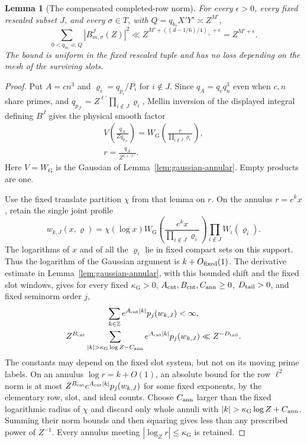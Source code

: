 \documentclass[11pt,a4paper]{article}
\numberwithin{equation}{section}
\numberwithin{figure}{section}
\newtheorem{lemma}[theorem]{Lemma}
\theoremstyle{definition}
\theoremstyle{remark}
\begin{document}
\begin{lemma}[The compensated completed-row norm]\label{lem:probe-row-norm}
For every $\epsilon>0$, every fixed rescaled subset $J$, and every
$\sigma\in T$, with $Q=q_{b_*}X'Y'\asymp Z^{M'}$,
\begin{equation}
 \sum_{0<q_m\ll Q}|B^J_{m,\sigma}(Z)|^2
       \ll Z^{M'+((d-1/6)/4)_++\epsilon}
       =Z^{M'+\epsilon}.
 \label{old-eq:5.4}
\end{equation}
The bound is uniform in the fixed rescaled tuple and has no
loss depending on the mesh of the surviving slots.
\end{lemma}

\begin{proof}
Put $A=cn^3$ and $\varrho_i=q_{p_i}/P_i$ for $i\notin J$.  Since
$q_A=q_cq_n^3$ even when $c,n$ share primes, and
$q_{p_{J^c}}=Z^{\ell'}\prod_{i\notin J}\varrho_i$, Mellin inversion
of the displayed integral defining $B^J$ gives the physical smooth factor
\[
 \begin{gathered}
 V\!\left(\frac{q_A}{Zq_{p_{J^c}}}\right)
 =W_{\mathrm G}\!\left(\frac{r}{\prod_{i\notin J}\varrho_i}\right),\\
 r=\frac{q_A}{Z^{1+\ell'}}.
 \end{gathered}
\]
Here $V=W_{\mathrm G}$ is the Gaussian of
Lemma~\ref{lem:gaussian-annular}.  Empty products are one.

Use the fixed translate partition $\chi$ from that lemma on $r$.
On the annulus $r=e^kx$, retain the single joint profile
\[
 w_{k,J}(x,\boldsymbol\varrho)
 =\chi(\log x)W_{\mathrm G}\!\left(
       \frac{e^kx}{\prod_{i\notin J}\varrho_i}\right)
       \prod_{i\notin J}W_i(\varrho_i).
\]
The logarithms of $x$ and of all the $\varrho_i$ lie in fixed compact
sets on this support.  Thus the logarithm of the Gaussian argument is
$k+O_{\rm fixed}(1)$.  The derivative estimate in
Lemma~\ref{lem:gaussian-annular}, with this bounded shift and the fixed
slot windows, gives for every fixed $\kappa_{\mathrm G}>0$,
$A_{\rm cnt},B_{\rm cnt},C_{\rm ann}\ge0$, $D_{\rm tail}>0$, and
fixed seminorm order $j$,
\[
 \begin{gathered}
 \sum_{k\in\mathbb Z}e^{A_{\rm cnt}|k|}p_j(w_{k,J})<\infty,
 \\
 Z^{B_{\rm cnt}}
 \sum_{|k|>\kappa_{\mathrm G}\log Z-C_{\rm ann}}
       e^{A_{\rm cnt}|k|}p_j(w_{k,J})
       \ll Z^{-D_{\rm tail}}.
 \end{gathered}
\]
The constants may depend on the fixed slot system, but not on its moving
prime labels.  On an annulus $\log r=k+O(1)$, an absolute bound for the
row $\ell^2$ norm is at most
$Z^{B_{\rm cnt}}e^{A_{\rm cnt}|k|}p_j(w_{k,J})$ for some fixed exponents,
by the elementary row, slot, and ideal counts.  Choose $C_{\rm ann}$ larger
than the fixed logarithmic radius of $\chi$ and discard only whole annuli
with $|k|>\kappa_{\mathrm G}\log Z+C_{\rm ann}$.  Summing their norm bounds
and then squaring gives less than any prescribed power of $Z^{-1}$.
Every annulus meeting $|\log_Z r|\le\kappa_{\mathrm G}$ is retained.


\end{proof}
\end{document}
